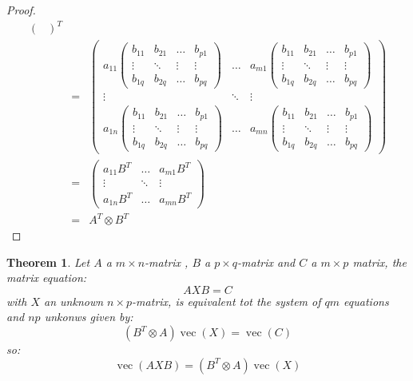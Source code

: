 \documentclass[a4paper,11pt]{report}
\newtheorem{theorem}{Theorem}[section]
\newcommand{\vect}{\operatorname{vec}}
\begin{document}
\begin{proof}
\begin{eqnarray*}
\begin{pmatrix}
  \end{pmatrix}^T\\
  &=& \begin{pmatrix}
  a_{11}\begin{pmatrix}
  b_{11} & b_{21}  &\ldots & b_{p1}\\
  \vdots & \ddots & \vdots &\vdots\\
  b_{1q} & b_{2q} & \ldots & b_{pq}
  \end{pmatrix} & \ldots & a_{m1}\begin{pmatrix}
  b_{11} & b_{21}  &\ldots & b_{p1}\\
  \vdots & \ddots & \vdots &\vdots\\
  b_{1q} & b_{2q} & \ldots & b_{pq}
  \end{pmatrix}\\
  \vdots & \ddots & \vdots \\
  a_{1n}\begin{pmatrix}
  b_{11} & b_{21}  &\ldots & b_{p1}\\
  \vdots & \ddots & \vdots &\vdots\\
  b_{1q} & b_{2q} & \ldots & b_{pq}
  \end{pmatrix} & \ldots & a_{mn}\begin{pmatrix}
  b_{11} & b_{21}  &\ldots & b_{p1}\\
  \vdots & \ddots & \vdots &\vdots\\
  b_{1q} & b_{2q} & \ldots & b_{pq}
  \end{pmatrix}
  \end{pmatrix} \\
  &=&\begin{pmatrix}
  a_{11}B^T & \ldots & a_{m1}B^T\\
  \vdots & \ddots & \vdots \\
  a_{1n}B^T & \ldots & a_{mn}B^T  \end{pmatrix}\\
  &=& A^T \otimes B^T
  \end{eqnarray*}
\end{proof}
\begin{theorem}\label{tensor}
  Let $A$ a $m \times n$-matrix , $B$ a $p\times q$-matrix and $C$ a $m \times 
  p$ matrix, the matrix equation:
 $$AXB = C$$ with $X$ an unknown $n \times p$-matrix, is equivalent tot the 
 system of $qm$ equations and $np$ unkonws given by:
 $$(B^T \otimes A)\vect(X) = \vect(C)$$
 so:
 $$\vect(AXB) = (B^T \otimes A)\vect(X)$$
\end{theorem}
\end{document}
